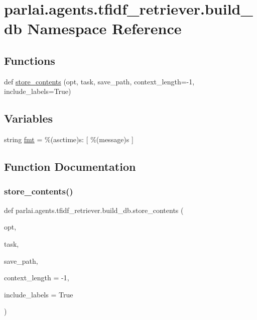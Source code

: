 \hypertarget{namespaceparlai_1_1agents_1_1tfidf__retriever_1_1build__db}{}\section{parlai.\+agents.\+tfidf\+\_\+retriever.\+build\+\_\+db Namespace Reference}
\label{namespaceparlai_1_1agents_1_1tfidf__retriever_1_1build__db}
\subsection*{Functions}
\begin{DoxyCompactItemize}
\item 
def \hyperlink{namespaceparlai_1_1agents_1_1tfidf__retriever_1_1build__db_a794fe63c76c7ac42ca1ac1b18c2528f4}{store\+\_\+contents} (opt, task, save\+\_\+path, context\+\_\+length=-\/1, include\+\_\+labels=True)
\end{DoxyCompactItemize}
\subsection*{Variables}
\begin{DoxyCompactItemize}
\item 
string \hyperlink{namespaceparlai_1_1agents_1_1tfidf__retriever_1_1build__db_a7a8b2cb13da2ca64f153da8af410072e}{fmt} = \textquotesingle{}\%(asctime)s\+: \mbox{[} \%(message)s \mbox{]}\textquotesingle{}
\end{DoxyCompactItemize}


\subsection{Function Documentation}
\mbox{\label{namespaceparlai_1_1agents_1_1tfidf__retriever_1_1build__db_a794fe63c76c7ac42ca1ac1b18c2528f4}} 
\subsubsection{\texorpdfstring{store\+\_\+contents()}{store\_contents()}}
{\footnotesize\ttfamily def parlai.\+agents.\+tfidf\+\_\+retriever.\+build\+\_\+db.\+store\+\_\+contents (\begin{DoxyParamCaption}\item[{}]{opt,  }\item[{}]{task,  }\item[{}]{save\+\_\+path,  }\item[{}]{context\+\_\+length = {\ttfamily -\/1},  }\item[{}]{include\+\_\+labels = {\ttfamily True} }\end{DoxyParamCaption})}

